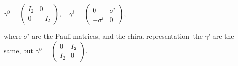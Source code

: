 \centerline{${\displaystyle \gamma ^{0}={\begin{pmatrix}I_{2}&0\\0&-I_{2}\end{pmatrix}},\quad \gamma ^{i}={\begin{pmatrix}0&\sigma ^{i}\\-\sigma ^{i}&0\end{pmatrix}},}$}


where $\sigma ^{i}$ are the Pauli matrices, and the chiral representation: the $\gamma^i$ are the same, but ${\displaystyle \gamma ^{0}={\begin{pmatrix}0&I_{2}\\I_{2}&0\end{pmatrix}}.}$
